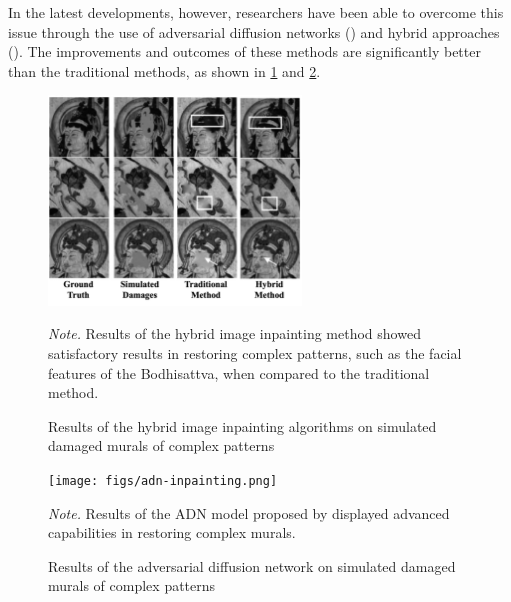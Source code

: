 In the latest developments, however, researchers have been able to overcome this issue through the use of
adversarial diffusion networks () and hybrid approaches
(). The improvements and outcomes of these methods are significantly
better than the traditional methods, as shown in \cref{fig:hybrid-image-inpainting} and
\cref{fig:adversarial-diffusion-inpainting}.

\begin{figure}
    \caption{Results of the hybrid image inpainting algorithms on simulated damaged murals of complex patterns}
    \label{fig:hybrid-image-inpainting}

    \begin{center}
        \includegraphics[width=0.6\textwidth]{figs/hybrid-method-inpainting.png}
    \end{center}

    \small\textit{Note.} Results of the hybrid image inpainting method showed satisfactory results in restoring
    complex patterns, such as the facial features of the Bodhisattva, when compared to the traditional method.
\end{figure}

\begin{figure}
    \caption{Results of the adversarial diffusion network on simulated damaged murals of complex patterns}
    \label{fig:adversarial-diffusion-inpainting}

    \begin{center}
        \texttt{[image: figs/adn-inpainting.png]}
    \end{center}

    \small\textit{Note.} Results of the ADN model proposed by 
    displayed advanced capabilities in restoring complex murals.
\end{figure}

